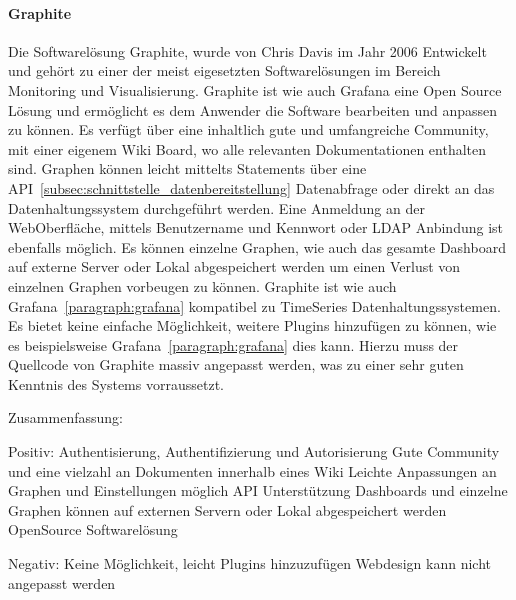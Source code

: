 \paragraph{Graphite}
\label{paragraph:graphite}
Die Softwarelösung Graphite, wurde von Chris Davis im Jahr 2006 Entwickelt und
gehört zu einer der meist eigesetzten Softwarelösungen im Bereich Monitoring
und Visualisierung. Graphite ist wie auch Grafana eine Open Source Lösung und
ermöglicht es dem Anwender die Software bearbeiten und anpassen zu können. Es
verfügt über eine inhaltlich gute und umfangreiche Community, mit einer eigenem
Wiki Board, wo alle relevanten Dokumentationen enthalten sind. Graphen können
leicht mittelts Statements über eine
API~\ref{subsec:schnittstelle_datenbereitstellung} Datenabfrage oder direkt an das
Datenhaltungssystem durchgeführt werden. Eine Anmeldung an der WebOberfläche,
mittels Benutzername und Kennwort oder \gls{LDAP} Anbindung ist ebenfalls
möglich. Es können einzelne Graphen, wie auch das gesamte Dashboard auf externe
Server oder Lokal abgespeichert werden um einen Verlust von einzelnen Graphen
vorbeugen zu können. Graphite ist wie auch Grafana~\ref{paragraph:grafana}
kompatibel zu TimeSeries Datenhaltungssystemen. Es bietet keine einfache
Möglichkeit, weitere Plugins hinzufügen zu können, wie es beispielsweise
Grafana~\ref{paragraph:grafana} dies kann. Hierzu muss der Quellcode von
Graphite massiv angepasst werden, was zu einer sehr guten Kenntnis des Systems
vorraussetzt.


Zusammenfassung:

\begin{outline}
  Positiv:
  \1 Authentisierung, Authentifizierung und Autorisierung
  \1 Gute Community und eine vielzahl an Dokumenten innerhalb eines Wiki
  \1 Leichte Anpassungen an Graphen und Einstellungen möglich
  \1 API Unterstützung
  \1 Dashboards und einzelne Graphen können auf externen Servern oder Lokal
  abgespeichert werden
  \1 OpenSource Softwarelösung


  Negativ:
  \1 Keine Möglichkeit, leicht Plugins hinzuzufügen
  \1 Webdesign kann nicht angepasst werden
\end{outline}


